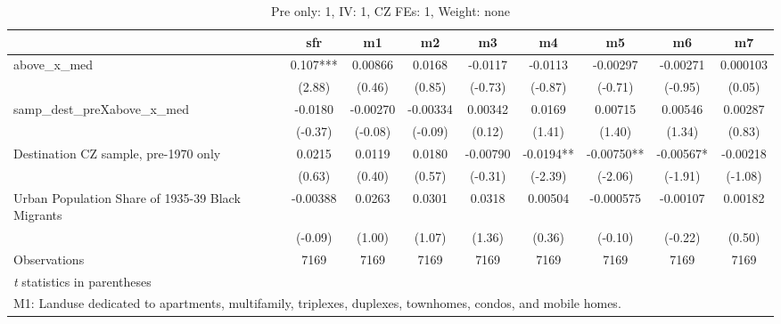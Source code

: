 \begin{table}[htbp]\centering
\def\sym#1{\ifmmode^{#1}\else\(^{#1}\)\fi}
\caption{Pre only: 1, IV: 1, CZ FEs: 1, Weight: none}
\begin{tabular}{l*{8}{c}}
\toprule
                    &\multicolumn{1}{c}{sfr}&\multicolumn{1}{c}{m1}&\multicolumn{1}{c}{m2}&\multicolumn{1}{c}{m3}&\multicolumn{1}{c}{m4}&\multicolumn{1}{c}{m5}&\multicolumn{1}{c}{m6}&\multicolumn{1}{c}{m7}\\
\midrule
above\_x\_med         &       0.107***&     0.00866   &      0.0168   &     -0.0117   &     -0.0113   &    -0.00297   &    -0.00271   &    0.000103   \\
                    &      (2.88)   &      (0.46)   &      (0.85)   &     (-0.73)   &     (-0.87)   &     (-0.71)   &     (-0.95)   &      (0.05)   \\
\addlinespace
samp\_dest\_preXabove\_x\_med&     -0.0180   &    -0.00270   &    -0.00334   &     0.00342   &      0.0169   &     0.00715   &     0.00546   &     0.00287   \\
                    &     (-0.37)   &     (-0.08)   &     (-0.09)   &      (0.12)   &      (1.41)   &      (1.40)   &      (1.34)   &      (0.83)   \\
\addlinespace
Destination CZ sample, pre-1970 only&      0.0215   &      0.0119   &      0.0180   &    -0.00790   &     -0.0194** &    -0.00750** &    -0.00567*  &    -0.00218   \\
                    &      (0.63)   &      (0.40)   &      (0.57)   &     (-0.31)   &     (-2.39)   &     (-2.06)   &     (-1.91)   &     (-1.08)   \\
\addlinespace
Urban Population Share of 1935-39 Black Migrants&    -0.00388   &      0.0263   &      0.0301   &      0.0318   &     0.00504   &   -0.000575   &    -0.00107   &     0.00182   \\
                    &     (-0.09)   &      (1.00)   &      (1.07)   &      (1.36)   &      (0.36)   &     (-0.10)   &     (-0.22)   &      (0.50)   \\
\midrule
Observations        &        7169   &        7169   &        7169   &        7169   &        7169   &        7169   &        7169   &        7169   \\
\bottomrule
\multicolumn{9}{l}{\footnotesize \textit{t} statistics in parentheses}\\
\multicolumn{9}{l}{\footnotesize M1: Landuse dedicated to apartments, multifamily, triplexes, duplexes, townhomes, condos, and mobile homes.}\\

\end{tabular}
\end{table}
